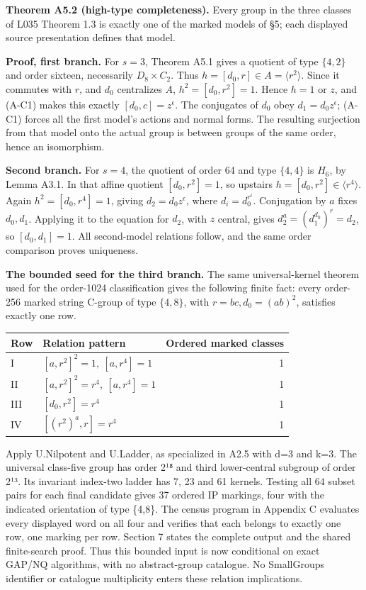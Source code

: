 \documentclass[
  11pt,
  a4paper,
]{article}
\newcounter{none} %
\begin{document}
\textbf{Theorem A5.2 (high-type completeness).} Every group in the three
classes of L035 Theorem 1.3 is exactly one of the marked models of §5;
each displayed source presentation defines that model.

\textbf{Proof, first branch.} For \(s=3\), Theorem A5.1 gives a quotient
of type \(\{4,2\}\) and order sixteen, necessarily \(D_8\times C_2\).
Thus \(h=[d_0,r]\in A=\langle r^2\rangle\). Since it commutes with
\(r\), and \(d_0\) centralizes \(A\), \(h^2=[d_0,r^2]=1\). Hence \(h=1\)
or \(z\), and (A-C1) makes this exactly \([d_0,c]=z^\epsilon\). The
conjugates of \(d_0\) obey \(d_1=d_0z^\epsilon\); (A-C1) forces all the
first model's actions and normal forms. The resulting surjection from
that model onto the actual group is between groups of the same order,
hence an isomorphism.

\textbf{Second branch.} For \(s=4\), the quotient of order 64 and type
\(\{4,4\}\) is \(H_6\), by Lemma A3.1. In that affine quotient
\([d_0,r^2]=1\), so upstairs \(h=[d_0,r^2]\in\langle r^4\rangle\). Again
\(h^2=[d_0,r^4]=1\), giving \(d_2=d_0z^\epsilon\), where
\(d_i=d_0^{r^i}\). Conjugation by \(a\) fixes \(d_0,d_1\). Applying it
to the equation for \(d_2\), with \(z\) central, gives
\(d_2^a=(d_1^{d_0})^r=d_2\), so \([d_0,d_1]=1\). All second-model
relations follow, and the same order comparison proves uniqueness.

\textbf{The bounded seed for the third branch.} The same
universal-kernel theorem used for the order-1024 classification gives
the following finite fact: every order-256 marked string C-group of type
\(\{4,8\}\), with \(r=bc,d_0=(ab)^2\), satisfies exactly one row.

{\def\LTcaptype{none} %
\begin{longtable}[]{@{}llr@{}}
\toprule\noalign{}
Row & Relation pattern & Ordered marked classes \\
\midrule\noalign{}
\endhead
\bottomrule\noalign{}
\endlastfoot
I & \([a,r^2]^2=1,\ [a,r^4]=1\) & 1 \\
II & \([a,r^2]^2=r^4,\ [a,r^4]=1\) & 1 \\
III & \([d_0,r^2]=r^4\) & 1 \\
IV & \([(r^2)^a,r]=r^4\) & 1 \\
\end{longtable}
}

Apply U.Nilpotent and U.Ladder, as specialized in A2.5 with d=3 and k=3.
The universal class-five group has order 2¹⁸ and third lower-central
subgroup of order 2¹³. Its invariant index-two ladder has 7, 23 and 61
kernels. Testing all 64 subset pairs for each final candidate gives 37
ordered IP markings, four with the indicated orientation of type
\{4,8\}. The census program in Appendix C evaluates every displayed word
on all four and verifies that each belongs to exactly one row, one
marking per row. Section 7 states the complete output and the shared
finite-search proof. Thus this bounded input is now conditional on exact
GAP/NQ algorithms, with no abstract-group catalogue. No SmallGroups
identifier or catalogue multiplicity enters these relation implications.
\end{document}
